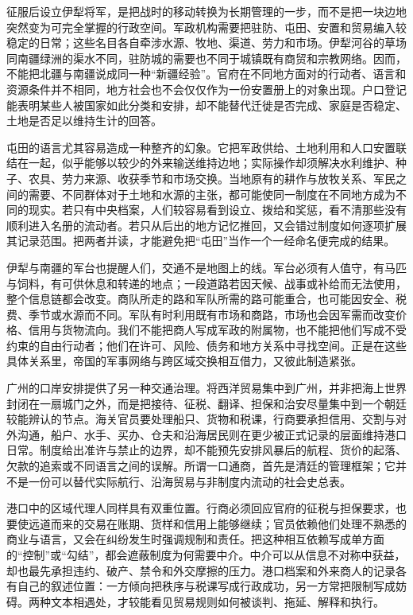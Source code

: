 征服后设立伊犁将军，是把战时的移动转换为长期管理的一步，而不是把一块边地突然变为可完全掌握的行政空间。军政机构需要把驻防、屯田、安置和贸易编入较稳定的日常；这些名目各自牵涉水源、牧地、渠道、劳力和市场。伊犁河谷的草场同南疆绿洲的渠水不同，驻防城的需要也不同于城镇既有商贸和宗教网络。因而，不能把北疆与南疆说成同一种“新疆经验”。官府在不同地方面对的行动者、语言和资源条件并不相同，地方社会也不会仅仅作为一份安置册上的对象出现。户口登记能表明某些人被国家如此分类和安排，却不能替代迁徙是否完成、家庭是否稳定、土地是否足以维持生计的回答。

屯田的语言尤其容易造成一种整齐的幻象。它把军政供给、土地利用和人口安置联结在一起，似乎能够以较少的外来输送维持边地；实际操作却须解决水利维护、种子、农具、劳力来源、收获季节和市场交换。当地原有的耕作与放牧关系、军民之间的需要、不同群体对于土地和水源的主张，都可能使同一制度在不同地方成为不同的现实。若只有中央档案，人们较容易看到设立、拨给和奖惩，看不清那些没有顺利进入名册的流动者。若只从后出的地方记忆推回，又会错过制度如何逐项扩展其记录范围。把两者并读，才能避免把“屯田”当作一个一经命名便完成的结果。

伊犁与南疆的军台也提醒人们，交通不是地图上的线。军台必须有人值守，有马匹与饲料，有可供休息和转递的地点；一段道路若因天候、战事或补给而无法使用，整个信息链都会改变。商队所走的路和军队所需的路可能重合，也可能因安全、税费、季节或水源而不同。军队有时利用既有市场和商路，市场也会因军需而改变价格、信用与货物流向。我们不能把商人写成军政的附属物，也不能把他们写成不受约束的自由行动者；他们在许可、风险、债务和地方关系中寻找空间。正是在这些具体关系里，帝国的军事网络与跨区域交换相互借力，又彼此制造紧张。

广州的口岸安排提供了另一种交通治理。将西洋贸易集中到广州，并非把海上世界封闭在一扇城门之外，而是把接待、征税、翻译、担保和治安尽量集中到一个朝廷较能辨认的节点。海关官员要处理船只、货物和税课，行商要承担信用、交割与对外沟通，船户、水手、买办、仓夫和沿海居民则在更少被正式记录的层面维持港口日常。制度给出准许与禁止的边界，却不能预先安排风暴后的航程、货价的起落、欠款的追索或不同语言之间的误解。所谓一口通商，首先是清廷的管理框架；它并不是一份可以替代实际航行、沿海贸易与非制度内流动的社会史总表。

港口中的区域代理人同样具有双重位置。行商必须回应官府的征税与担保要求，也要使远道而来的交易在账期、货样和信用上能够继续；官员依赖他们处理不熟悉的商业与语言，又会在纠纷发生时强调规制和责任。把这种相互依赖写成单方面的“控制”或“勾结”，都会遮蔽制度为何需要中介。中介可以从信息不对称中获益，却也最先承担违约、破产、禁令和外交摩擦的压力。港口档案和外来商人的记录各有自己的叙述位置：一方倾向把秩序与税课写成行政成功，另一方常把限制写成妨碍。两种文本相遇处，才较能看见贸易规则如何被谈判、拖延、解释和执行。

